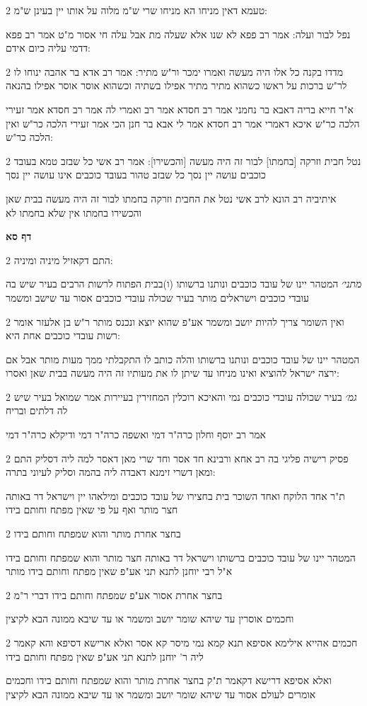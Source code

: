 \documentclass[12pt, openany]{book}
\newcommand{\sethebfont}{
\fontsize{10.5pt}{21.0pt} \selectfont
}
\newcommand{\twocol}[1]{
	{\sethebfont \begin{multicols}{2}
			#1
	\end{multicols}}	
}
\newcommand{\sectname}{}
\newcommand{\newsection}[1]{
	\addcontentsline{toc}{section}{#1}
	\renewcommand{\sectname}{#1}	
	\vspace{-\baselineskip}
	\begin{center}
		\textbf{%
\fontsize{16pt}{16pt}\selectfont
			#1}
	\end{center}
	\vspace{-\baselineskip}
	\nopagebreak
}
\begin{document}
\twocol{טעמא דאין מניחו הא מניחו שרי ש"מ מלוה על אותו יין בעינן ש"מ:
\par נפל לבור ועלה: אמר רב פפא לא שנו אלא שעלה מת אבל עלה חי אסור מ"ט אמר רב פפא דדמי עליה כיום אידם:}
\twocol{מדדו בקנה כל אלו היה מעשה ואמרו ימכר ור"ש מתיר: אמר רב אדא בר אהבה ינוחו לו לר"ש ברכות על ראשו כשהוא מתיר מתיר אפילו בשתיה וכשהוא אוסר אוסר אפילו בהנאה
\par א"ר חייא בריה דאבא בר נחמני אמר רב חסדא אמר רב ואמרי לה אמר רב חסדא אמר זעירי הלכה כר"ש איכא דאמרי אמר רב חסדא אמר לי אבא בר חנן הכי אמר זעירי הלכה כר"ש ואין הלכה כר"ש:}
\twocol{נטל חבית וזרקה [בחמתו] לבור זה היה מעשה [והכשירו]: אמר רב אשי כל שבזב טמא בעובד כוכבים עושה יין נסך כל שבזב טהור בעובד כוכבים אינו עושה יין נסך
\par איתיביה רב הונא לרב אשי נטל את החבית וזרקה בחמתו לבור זה היה מעשה בבית שאן והכשירו בחמתו אין שלא בחמתו לא}
\newsection{דף סא}
\twocol{התם דקאזיל מיניה ומיניה:
\par {\large\emph{מתני׳}} המטהר יינו של עובד כוכבים ונותנו ברשותו (ו)בבית הפתוח לרשות הרבים בעיר שיש בה עובדי כוכבים וישראלים מותר בעיר שכולה עובדי כוכבים אסור עד שישב ומשמר}
\twocol{ואין השומר צריך להיות יושב ומשמר אע"פ שהוא יוצא ונכנס מותר ר"ש בן אלעזר אומר רשות עובדי כוכבים אחת היא:
\par המטהר יינו של עובד כוכבים ונותנו ברשותו והלה כותב לו התקבלתי ממך מעות מותר אבל אם ירצה ישראל להוציא ואינו מניחו עד שיתן לו את מעותיו זה היה מעשה בבית שאן ואסרו:}
\twocol{{\large\emph{גמ׳}} בעיר שכולה עובדי כוכבים נמי והאיכא רוכלין המחזירין בעיירות אמר שמואל בעיר שיש לה דלתים ובריח
\par אמר רב יוסף וחלון כרה"ר דמי ואשפה כרה"ר דמי ודיקלא כרה"ר דמי}
\twocol{פסיק רישיה פליגי בה רב אחא ורבינא חד אסר וחד שרי מאן דאסר למה ליה דסליק התם ומאן דשרי זימנא דאבדה ליה בהמה וסליק לעיוני בתרה:
\par ת"ר אחד הלוקח ואחד השוכר בית בחצירו של עובד כוכבים ומילאהו יין וישראל דר באותה חצר מותר ואף על פי שאין מפתח וחותם בידו}
\twocol{בחצר אחרת מותר והוא שמפתח וחותם בידו
\par המטהר יינו של עובד כוכבים ברשותו וישראל דר באותה חצר מותר והוא שמפתח וחותם בידו א"ל רבי יוחנן לתנא תני אע"פ שאין מפתח וחותם בידו מותר}
\twocol{בחצר אחרת אסור אע"פ שמפתח וחותם בידו דברי ר"מ
\par וחכמים אוסרין עד שיהא שומר יושב ומשמר או עד שיבא ממונה הבא לקיצין}
\twocol{חכמים אהייא אילימא אסיפא תנא קמא נמי מיסר קא אסר ואלא ארישא דסיפא והא קאמר ליה ר' יוחנן לתנא תני אע"פ שאין מפתח וחותם בידו
\par ואלא אסיפא דרישא דקאמר ת"ק בחצר אחרת מותר והוא שמפתח וחותם בידו וחכמים אומרים לעולם אסור עד שיהא שומר יושב ומשמר או עד שיבא ממונה הבא לקיצין}
\end{document}
